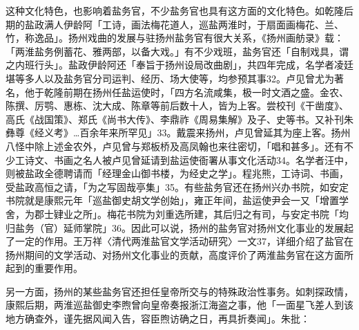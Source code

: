 \noindent 这种文化特色，也影响着盐务官，不少盐务官也具有这方面的文化特色。如乾隆后期的盐政满人伊龄阿「工诗，画法梅花道人，巡盐两淮时，于扇面画梅花、兰、竹，称逸品」。扬州戏曲的发展与驻扬州盐务官有很大关系，《扬州画舫录》载：「两淮盐务例蓄花、雅两部，以备大戏。」有不少戏班，盐务官还「自制戏具，谓之内班行头」。盐政伊龄阿还「奉旨于扬州设局改曲剧」，共四年完成，名学者凌廷堪等多人以及盐务官分司运判、经历、场大使等，均参预其事32。卢见曾尤为著名，他于乾隆前期在扬州任盐运使时，「四方名流咸集，极一时文酒之盛。金农、陈撰、厉鹗、惠栋、沈大成、陈章等前后数十人，皆为上客。尝校刊《干凿度》、高氏《战国策》、郑氏《尚书大传》、李鼎祚《周易集解》及子、史等书。又补刊朱彝尊《经义考》…百余年来所罕见」33。戴震来扬州，卢见曾延其为座上客。扬州八怪中除上述金农外，卢见曾与郑板桥及高凤翰也来往密切，「唱和甚多」。还有不少工诗文、书画之名人被卢见曾延请到盐运使衙署从事文化活动34。名学者汪中，则被盐政全德聘请而「经理金山御书楼，为经史之学」。程兆熊，工诗词、书画，受盐政高恒之请，「为之写固哉亭集」35。有些盐务官还在扬州兴办书院，如安定书院就是康熙元年「巡盐御史胡文学创始」，雍正年间，盐运使尹会一又「增置学舍，为郡士肄业之所」。梅花书院为刘重选所建，其后归之有司，与安定书院「均归盐务（官）延师掌院」36。因此可以说，扬州的盐务官对扬州文化事业的发展起了一定的作用。王万祥〈清代两淮盐官文学活动研究〉一文37，详细介绍了盐官在扬州期间的文学活动、对扬州文化事业的贡献，高度评价了两淮盐务官在这方面所起到的重要作用。

另一方面，扬州的某些盐务官还担任皇帝所交与的特殊政治性事务。如刺探政情，康熙后期，两淮巡盐御史李煦曾向皇帝奏报浙江海盗之事，他「一面星飞差人到该地方确查外，谨先据风闻入告，容臣煦访确之日，再具折奏闻」。朱批：

\vfill
\begin{BookNotes}
\end{BookNotes}

